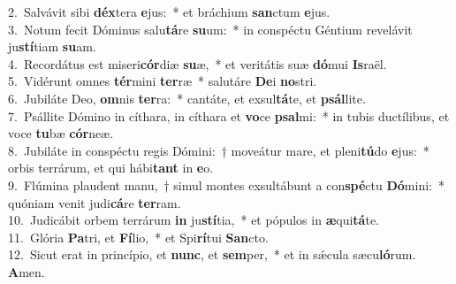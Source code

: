 {2.~}Salvávit sibi \textbf{déx}tera \textbf{e}jus:~* et bráchium \textbf{san}ctum \textbf{e}jus.\\
{3.~}Notum fecit Dóminus salu\textbf{tá}re \textbf{su}um:~* in conspéctu Géntium revelávit ju\textbf{stí}tiam \textbf{su}am.\\
{4.~}Recordátus est miseri\textbf{cór}diæ \textbf{su}æ,~* et veritátis suæ \textbf{dó}mui \textbf{Is}raël.\\
{5.~}Vidérunt omnes \textbf{tér}mini \textbf{ter}ræ~* salutáre \textbf{De}i \textbf{no}stri.\\
{6.~}Jubiláte Deo, \textbf{om}nis \textbf{ter}ra:~* cantáte, et exsul\textbf{tá}te, et \textbf{psál}lite.\\
{7.~}Psállite Dómino in cíthara, in cíthara et \textbf{vo}ce \textbf{psal}mi:~* in tubis ductílibus, et voce \textbf{tu}bæ \textbf{cór}neæ.\\
{8.~}Jubiláte in conspéctu regis Dómini:~† moveátur mare, et pleni\textbf{tú}do \textbf{e}jus:~* orbis terrárum, et qui hábi\textbf{tant} in \textbf{e}o.\\
{9.~}Flúmina plaudent manu,~† simul montes exsultábunt a con\textbf{spé}ctu \textbf{Dó}mini:~* quóniam venit judi\textbf{cá}re \textbf{ter}ram.\\
{10.~}Judicábit orbem terrárum \textbf{in} ju\textbf{stí}tia,~* et pópulos in \textbf{æ}qui\textbf{tá}te.\\
{11.~}Glória \textbf{Pa}tri, et \textbf{Fí}lio,~* et Spi\textbf{rí}tui \textbf{San}cto.\\
{12.~}Sicut erat in princípio, et \textbf{nunc}, et \textbf{sem}per,~* et in sǽcula sæcu\textbf{ló}rum. \textbf{A}men.\\

